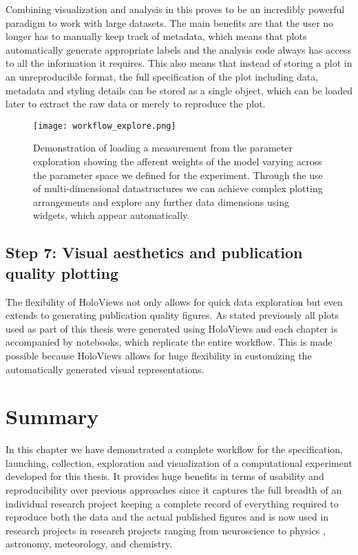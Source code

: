Combining visualization and analysis in this proves to be an
incredibly powerful paradigm to work with large datasets. The main
benefits are that the user no longer has to manually keep track of
metadata, which means that plots automatically generate appropriate
labels and the analysis code always has access to all the information
it requires. This also means that instead of storing a plot in an
unreproducible format, the full specification of the plot including
data, metadata and styling details can be stored as a single object,
which can be loaded later to extract the raw data or merely to
reproduce the plot.

\begin{figure}
	\centering
        \texttt{[image: workflow\_explore.png]}
	\caption[Demonstration of complex parameter exploration in
      HoloViews.]{Demonstration of loading a measurement from the
      parameter exploration showing the afferent weights of the model
      varying across the parameter space we defined for the
      experiment. Through the use of multi-dimensional datastructures
      we can achieve complex plotting arrangements and explore any
      further data dimensions using widgets, which appear
      automatically.}
	\label{workflow_explore}
\end{figure}

\subsection{Step 7: Visual aesthetics and publication quality plotting}

The flexibility of HoloViews not only allows for quick data
exploration but even extends to generating publication quality
figures. As stated previously all plots used as part of this thesis
were generated using HoloViews and each chapter is accompanied by
notebooks, which replicate the entire workflow. This is made possible
because HoloViews allows for huge flexibility in customizing the
automatically generated visual representations.

\section{Summary}

In this chapter we have demonstrated a complete workflow for the
specification, launching, collection, exploration and visualization of
a computational experiment developed for this thesis. It provides huge
benefits in terms of usability and reproducibility over previous
approaches since it captures the full breadth of an individual
research project keeping a complete record of everything required to
reproduce both the data and the actual published figures and is now
used in research projects in research projects ranging from
neuroscience \citep{Keemink2015} to physics \citep{Nijholt2015,
  Tenner2016}, astronomy, meteorology, and chemistry.

